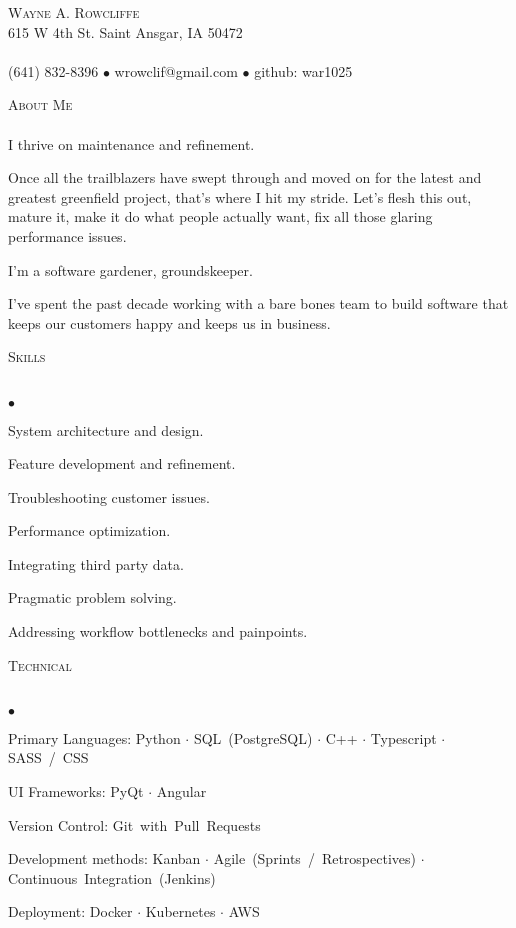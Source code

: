 \documentclass{article}
\newcommand{\lineunder} {
	\vspace*{-8pt} \\ \hspace*{-18pt} \hrulefill \\
}
\newcommand{\header}[1] {
	{\hspace*{-15pt}\vspace*{6pt} \textsc{#1}} \vspace*{-6pt} \lineunder
}
\newcommand{\contact}[4] {
	\vspace*{-8pt}\begin{center}{\LARGE \scshape {#1}}\\#2 \lineunder#3 $\bullet$ #4\end{center}\vspace*{-8pt}
}
\newenvironment{achievements} {
	\begin{list}{$\bullet$}
		{\topsep 0pt \itemsep -2pt}
	}{
		\vspace*{4pt}\end{list}
	}
\newcommand{\subject}[1] {\mbox{#1} $\cdot$}
\newcommand{\lastsubject}[1] {\mbox{#1}}
\begin{document}
\small
\smallskip
\vspace*{-44pt}

\contact{Wayne A. Rowcliffe}
{615 W 4th St. Saint Ansgar, IA 50472}
{(641) 832-8396 $\bullet$ wrowclif@gmail.com}%
{github: war1025}

\header{About Me}

I thrive on maintenance and refinement. \newline

Once all the trailblazers have swept through and moved on for the latest
and greatest greenfield project, that's where I hit my stride.
Let's flesh this out, mature it, make it do what people actually want,
fix all those glaring performance issues. \newline

I'm a software gardener, groundskeeper. \newline

I've spent the past decade working with a bare bones team to build software
that keeps our customers happy and keeps us in business. \newline

\header{Skills}

	\begin{achievements}
      \item{System architecture and design.}
      \item{Feature development and refinement.}
      \item{Troubleshooting customer issues.}
      \item{Performance optimization.}
      \item{Integrating third party data.}
      \item{Pragmatic problem solving.}
      \item{Addressing workflow bottlenecks and painpoints.}
   \end{achievements}

\header{Technical}

   \begin{achievements}
		\item{Primary Languages:
			\subject{Python}
         \subject{SQL (PostgreSQL)}
			\subject{C++}
			\subject{Typescript}
			\lastsubject{SASS / CSS}
		}
		\item{UI Frameworks:
         \subject{PyQt}
         \lastsubject{Angular}
		}
      \item{Version Control:
         \lastsubject{Git with Pull Requests}
      }
      \item{Development methods:
         \subject{Kanban}
         \subject{Agile (Sprints / Retrospectives)}
         \lastsubject{Continuous Integration (Jenkins)}
      }
      \item{Deployment:
         \subject{Docker}
         \subject{Kubernetes}
         \lastsubject{AWS}
      }
	\end{achievements}
\end{document}
